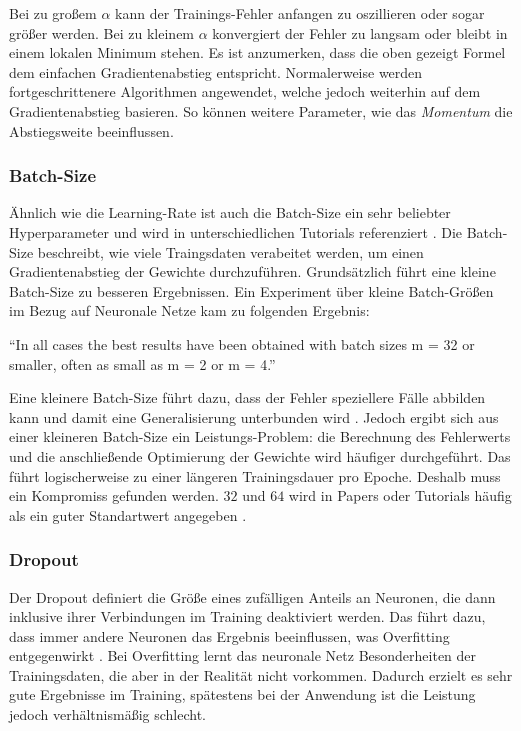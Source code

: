 Bei zu großem \(\alpha\) kann der Trainings-Fehler anfangen zu oszillieren oder sogar größer werden.
Bei zu kleinem \(\alpha\) konvergiert der Fehler zu langsam oder bleibt in einem lokalen Minimum stehen. 
Es ist anzumerken, dass die oben gezeigt Formel dem einfachen Gradientenabstieg entspricht.
Normalerweise werden fortgeschrittenere Algorithmen angewendet, welche jedoch weiterhin auf dem Gradientenabstieg basieren.
So können weitere Parameter, wie das \textit{Momentum} die Abstiegsweite beeinflussen.

\subsubsection{Batch-Size}
Ähnlich wie die Learning-Rate ist auch die Batch-Size ein sehr beliebter Hyperparameter und wird in unterschiedlichen Tutorials referenziert \cite{tutorial:tune-batch-size-analyticsvidhya, tutorial:tune-batch-size-machinelearningmastery}.
Die Batch-Size beschreibt, wie viele Traingsdaten verabeitet werden, um einen Gradientenabstieg der Gewichte durchzuführen.
Grundsätzlich führt eine kleine Batch-Size zu besseren Ergebnissen.
Ein Experiment über kleine Batch-Größen im Bezug auf Neuronale Netze kam zu folgenden Ergebnis: 

\begin{displayquote}
	\enquote{In all cases the best results have been obtained with batch sizes m = 32 or smaller, often as small as m = 2 or m = 4.}
	\cite[S. 16, Z. 5-7]{small-batch-size}
\end{displayquote}

Eine kleinere Batch-Size führt dazu, dass der Fehler speziellere Fälle abbilden kann und damit eine Generalisierung unterbunden wird \cite{tutorial:tune-batch-size-machinelearningmastery}.
Jedoch ergibt sich aus einer kleineren Batch-Size ein Leistungs-Problem: die Berechnung des Fehlerwerts und die anschließende Optimierung der Gewichte wird häufiger durchgeführt.
Das führt logischerweise zu einer längeren Trainingsdauer pro Epoche.
Deshalb muss ein Kompromiss gefunden werden.
$32$ und $64$ wird in Papers oder Tutorials häufig als ein guter Standartwert angegeben \cite{default-batch-size}. 

\subsubsection{Dropout}
Der Dropout definiert die Größe eines zufälligen Anteils an Neuronen, die dann inklusive ihrer Verbindungen im Training deaktiviert werden.
Das führt dazu, dass immer andere Neuronen das Ergebnis beeinflussen, was Overfitting entgegenwirkt \cite{JMLR:v15:srivastava14a}.
Bei Overfitting lernt das neuronale Netz Besonderheiten der Trainingsdaten, die aber in der Realität nicht vorkommen.
Dadurch erzielt es sehr gute Ergebnisse im Training, spätestens bei der Anwendung ist die Leistung jedoch verhältnismäßig schlecht.

